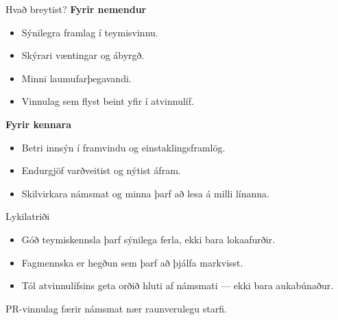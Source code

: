 \documentclass[
    NAME={Dr. Helga Ingimundardóttir},
    EMAIL={helgaingim@hi.is},
    FACULTY={Iðnaðarverkfræði},
    TITLE={Sýnileg samvinna með tólum atvinnulífsins},
    SUBTITLE={PR vinnulag og gagnsæir ferlar í verkefnadrifinni verkfræðikennslu},
    SEMINAR={Kennsluráðstefna KHA},
    DATE={28. mars 2026},
    WIDE=true,
    ICELANDIC=true
]{HI-LaTeX//hi-beamer}
\begin{document}
\begin{frame}{Hvað breytist?}
\textbf{Fyrir nemendur}
\begin{itemize}
  \item Sýnilegra framlag í teymisvinnu.
  \item Skýrari væntingar og ábyrgð.
  \item Minni laumufarþegavandi.
  \item Vinnulag sem flyst beint yfir í atvinnulíf.
\end{itemize}

\vspace{0.75em}
\textbf{Fyrir kennara}
\begin{itemize}
  \item Betri innsýn í framvindu og einstaklingsframlög.
  \item Endurgjöf varðveitist og nýtist áfram.
  \item Skilvirkara námsmat og minna þarf að lesa á milli línanna.
\end{itemize}

\end{frame}


\begin{frame}{Lykilatriði}
\begin{itemize}
  \item Góð teymiskennsla þarf sýnilega ferla, ekki bara lokaafurðir.
  \item Fagmennska er hegðun sem þarf að þjálfa markvisst.
  \item Tól atvinnulífsins geta orðið hluti af námsmati --- ekki bara aukabúnaður.
\end{itemize}

\vspace{1em}
\begin{center}
\large
PR-vinnulag færir námsmat nær raunverulegu starfi.
\end{center}


\end{frame}
\end{document}
